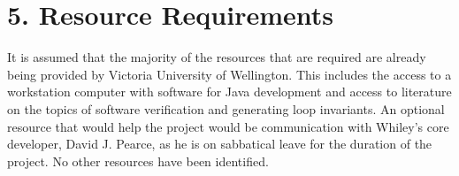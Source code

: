 \documentclass[11pt, a4paper, twoside, openright]{report}
\begin{document}

\section*{5. Resource Requirements}


It is assumed that the majority of the resources that are required are already being
provided by Victoria University of Wellington.
This includes the access to a workstation computer with software for Java development
and access to literature on the topics of software verification
and generating loop invariants.
An optional resource that would help the project would be communication
with Whiley's core developer, David J. Pearce, as he is on sabbatical leave for the duration
of the project.
No other resources have been identified.



\backmatter

%


\end{document}

